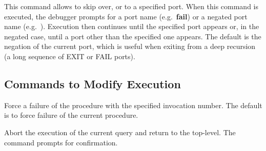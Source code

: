 \begin{descr}{1cm}
%
% 
% 
% 

This command allows to skip over, or to a specified port.  When this
command is executed, the debugger prompts for a port name (e.g.\ {\bf fail})
or a negated port name (e.g.\ ).
Execution then continues until the specified port appears or,
in the negated case, until a port other than the specified one appears.
The default is the negation of the current port, which is useful
when exiting from a deep recursion (a long sequence of EXIT or FAIL ports).


\end{descr}

\subsection{Commands to Modify Execution}
\begin{descr}{1cm}

Force a failure of the procedure with the specified invocation number.
The default is to force failure of the current procedure.

Abort the execution of the current query and return to the top-level.
The command prompts for confirmation.
\end{descr}


